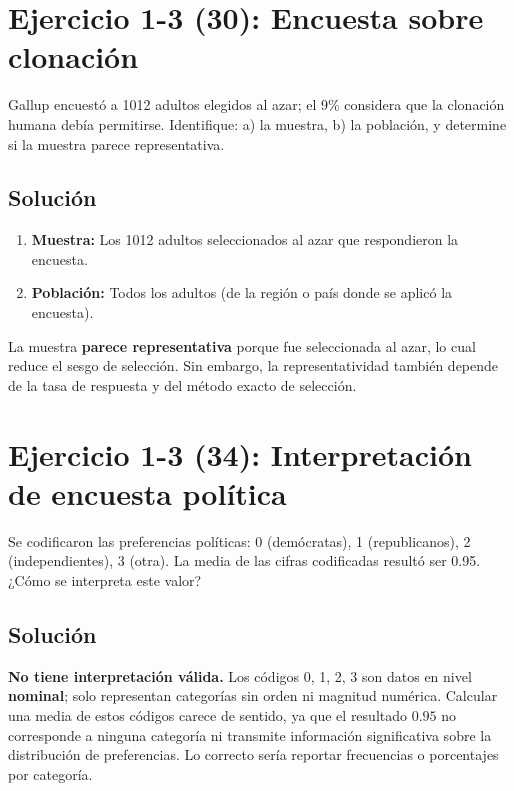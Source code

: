 \documentclass[a4paper]{article}
\begin{document}
\section{Ejercicio 1-3 (30): Encuesta sobre clonación}

Gallup encuestó a 1012 adultos elegidos al azar; el 9\% considera que la clonación humana debía permitirse. Identifique: a) la muestra, b) la población, y determine si la muestra parece representativa.

\subsection{Solución}

\begin{enumerate}
    \item[a)] \textbf{Muestra:} Los 1012 adultos seleccionados al azar que respondieron la encuesta.
    \item[b)] \textbf{Población:} Todos los adultos (de la región o país donde se aplicó la encuesta).
\end{enumerate}

La muestra \textbf{parece representativa} porque fue seleccionada al azar, lo cual reduce el sesgo de selección. Sin embargo, la representatividad también depende de la tasa de respuesta y del método exacto de selección.

\section{Ejercicio 1-3 (34): Interpretación de encuesta política}

Se codificaron las preferencias políticas: 0 (demócratas), 1 (republicanos), 2 (independientes), 3 (otra). La media de las cifras codificadas resultó ser 0.95. ¿Cómo se interpreta este valor?

\subsection{Solución}

\textbf{No tiene interpretación válida.} Los códigos 0, 1, 2, 3 son datos en nivel \textbf{nominal}; solo representan categorías sin orden ni magnitud numérica. Calcular una media de estos códigos carece de sentido, ya que el resultado $0.95$ no corresponde a ninguna categoría ni transmite información significativa sobre la distribución de preferencias. Lo correcto sería reportar frecuencias o porcentajes por categoría.
\end{document}
